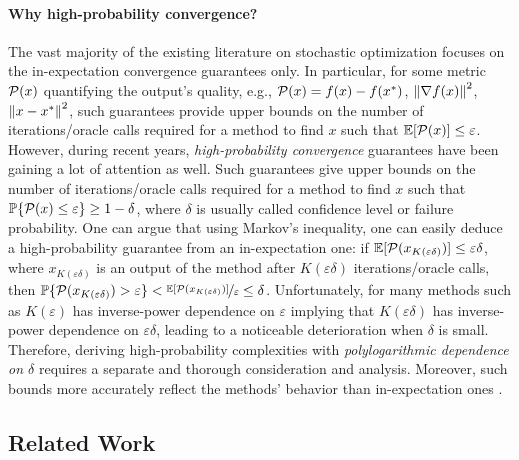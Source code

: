 \documentclass{article}
\begin{document}
\paragraph{Why high-probability convergence?} The vast majority of the existing literature on stochastic optimization focuses on the in-expectation convergence guarantees only. In particular, for some metric ${\cal P}(x)$ quantifying the output's quality, e.g., ${\cal P}(x) = f(x) - f(x^*)$, ${\left\lVert\nabla f(x)\right\rVert}^2$, ${\left\lVert x - x^*\right\rVert}^2$, such guarantees provide upper bounds on the number of iterations/oracle calls required for a method to find $x$ such that $\mathbb{E}[{\cal P}(x)] \leq \varepsilon$. However, during recent years, \emph{high-probability convergence} guarantees have been gaining a lot of attention as well. Such guarantees give upper bounds on the number of iterations/oracle calls required for a method to find $x$ such that ${\mathbb P}\{{\cal P}(x) \leq \varepsilon\} \geq 1-\delta$, where $\delta$ is usually called confidence level or failure probability. One can argue that using Markov's inequality, one can easily deduce a high-probability guarantee from an in-expectation one: if $\mathbb{E}[{\cal P}(x_{K(\varepsilon\delta)})] \leq \varepsilon\delta$, where $x_{K(\varepsilon\delta)}$ is an output of the method after $K(\varepsilon\delta)$ iterations/oracle calls, then ${\mathbb P}\{{\cal P}(x_{K(\varepsilon\delta)}) > \varepsilon\} < \nicefrac{\mathbb{E}[{\cal P}(x_{K(\varepsilon\delta)})]}{\varepsilon} \leq \delta$. Unfortunately, for many methods such as  \citep{ghadimi2013stochastic} $K(\varepsilon)$ has inverse-power dependence on $\varepsilon$ implying that $K(\varepsilon\delta)$ has inverse-power dependence on $\varepsilon\delta$, leading to a noticeable deterioration when $\delta$ is small. Therefore, deriving high-probability complexities with \emph{polylogarithmic dependence on $\delta$} requires a separate and thorough consideration and analysis. Moreover, such bounds more accurately reflect the methods' behavior than in-expectation ones \citep{gorbunov2020stochastic}.

\subsection{Related Work}\label{section:related}
\end{document}
